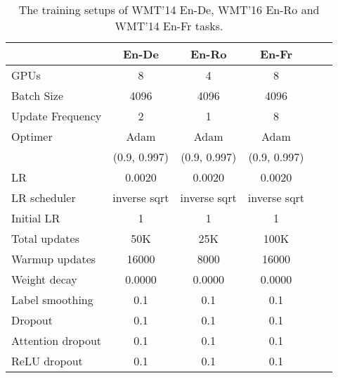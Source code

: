 \documentclass[11pt]{article}
\begin{document}
\begin{table}[ht!]
\centering
\small
\setlength{\tabcolsep}{1.5pt}
\begin{tabular}{lccccc}
\toprule
& \bf En-De & \bf En-Ro & \bf En-Fr   \\
\midrule
GPUs & 8 & 4 & 8 \\
Batch Size & 4096 &4096 & 4096 \\
Update Frequency & 2 & 1 & 8 &\\
Optimer & Adam  & Adam  & Adam  \\
{}  & (0.9, 0.997)  & (0.9, 0.997)  & (0.9, 0.997)   \\
LR & 0.0020 &0.0020 & 0.0020 \\
LR scheduler  & inverse sqrt &inverse sqrt & inverse sqrt \\
Initial LR & 1 &1 & 1  \\
Total updates & 50K & 25K& 100K \\
Warmup updates & 16000 &8000 & 16000  \\
Weight decay & 0.0000 &0.0000 &  0.0000\\
Label smoothing & 0.1 & 0.1 & 0.1 \\
Dropout & 0.1  & 0.1  & 0.1  \\
Attention dropout & 0.1 & 0.1 & 0.1 \\
ReLU dropout & 0.1 & 0.1 & 0.1 \\
\toprule
\end{tabular}
\caption{The training setups of WMT'14 En-De, WMT'16 En-Ro and WMT'14 En-Fr tasks.  }
\label{tab:training_ende_enfr_enro}
\end{table}
\end{document}
